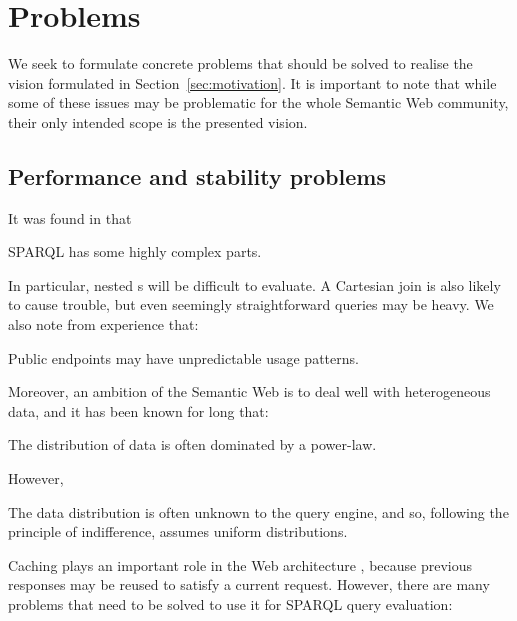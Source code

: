 \section{Problems}\label{sec:problems}

We seek to formulate concrete problems that should be solved to
realise the vision formulated in Section~\ref{sec:motivation}. It is
important to note that while some of these issues may be problematic
for the whole Semantic Web community, their only intended scope is the
presented vision.

\subsection{Performance and stability problems}\label{sec:perfproblems}

It was found in \cite{perez2009semantics} that

\begin{problem}\label{prob:sparqlcomplex}
SPARQL has some highly complex parts.
\end{problem}

In particular, nested s will be difficult to
evaluate. A Cartesian join is also likely to cause trouble, but even
seemingly straightforward queries may be heavy. We also note from
experience that:

\begin{problem}\label{prob:endpointunpred}
Public endpoints may have unpredictable usage patterns.
\end{problem}

Moreover, an ambition of the Semantic Web is to deal well with
heterogeneous data, and it has been known for long \cite{1385469} that:

\begin{problem}\label{prob:zipf}
The distribution of data is often dominated by a power-law.
\end{problem}
However, 
\begin{problem}\label{prob:uniform}
The data distribution is often unknown to the query engine, and so,
following the principle of indifference, assumes uniform
distributions.
\end{problem}


Caching plays an important role in the Web architecture
\cite{Jacobs:04:AWW}, because previous responses may be reused to
satisfy a current request. However, there are many problems that need
to be solved to use it for SPARQL query evaluation:

